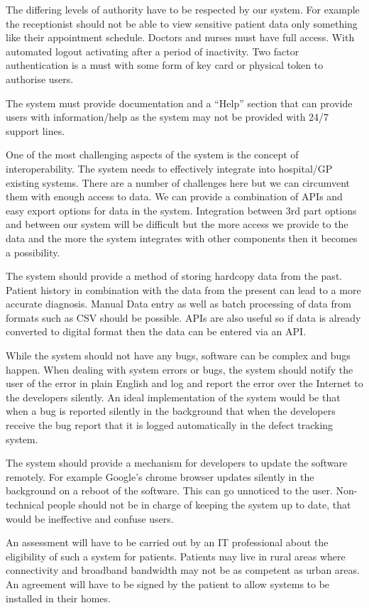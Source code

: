 The differing levels of authority have to be respected by our system. For example the receptionist should not be able to view sensitive patient data only something like their appointment schedule. Doctors and nurses must have full access. With automated logout activating after a period of inactivity. Two factor authentication is a must with some form of key card or physical token to authorise users. 

The system must provide documentation and a “Help” section that can provide users with information/help as the system may not be provided with 24/7 support lines.

One of the most challenging aspects of the system is the concept of interoperability. The system needs to effectively integrate into hospital/GP existing systems. There are a number of challenges here but we can circumvent them with enough access to data. We can provide a combination of APIs and easy export options for data in the system. Integration between 3rd part options and between our system will be difficult but the more access we provide to the data and the more the system integrates with other components then it becomes a possibility.

The system should provide a method of storing hardcopy data from the past. Patient history in combination with the data from the present can lead to a more accurate diagnosis. Manual Data entry as well as batch processing of data from formats such as CSV should be possible. APIs are also useful so if data is already converted to digital format then the data can be entered via an API.

While the system should not have any bugs, software can be complex and bugs happen. When dealing with system errors or bugs, the system should notify the user of the error in plain English and log and report the error over the Internet to the developers silently. An ideal implementation of the system would be that when a bug is reported silently in the background that when the developers receive the bug report that it is logged automatically in the defect tracking system.

The system should provide a mechanism for developers to update the software remotely. For example Google’s chrome browser updates silently in the background on a reboot of the software. This can go unnoticed to the user. Non-technical people should not be in charge of keeping the system up to date, that would be ineffective and confuse users.

An assessment will have to be carried out by an IT professional about the eligibility of such a system for patients. Patients may live in rural areas where connectivity and broadband bandwidth may not be as competent as urban areas. An agreement will have to be signed by the patient to allow systems to be installed in their homes.

